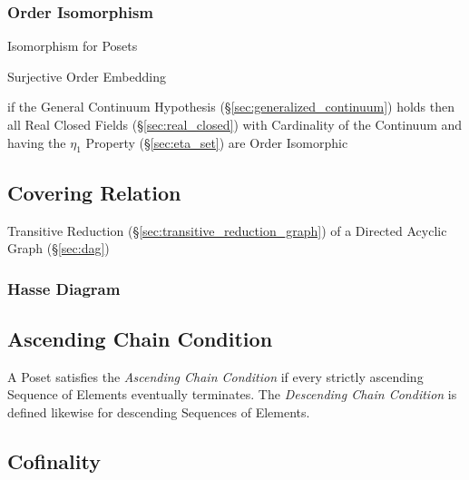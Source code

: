 \subsubsection{Order Isomorphism}\label{sec:order_isomorphism}

Isomorphism for Posets

Surjective Order Embedding

if the General Continuum Hypothesis (\S\ref{sec:generalized_continuum}) holds
then all Real Closed Fields (\S\ref{sec:real_closed}) with Cardinality of the
Continuum and having the $\eta_1$ Property (\S\ref{sec:eta_set}) are Order
Isomorphic



\subsection{Covering Relation}\label{sec:covering_relation}

Transitive Reduction (\S\ref{sec:transitive_reduction_graph}) of a
Directed Acyclic Graph (\S\ref{sec:dag})



\subsubsection{Hasse Diagram}\label{sec:hasse_diagram}



\subsection{Ascending Chain Condition}\label{sec:ascending_chain}

A Poset satisfies the \emph{Ascending Chain Condition} if every
strictly ascending Sequence of Elements eventually terminates. The
\emph{Descending Chain Condition} is defined likewise for descending
Sequences of Elements.



\subsection{Cofinality}\label{sec:cofinality}


